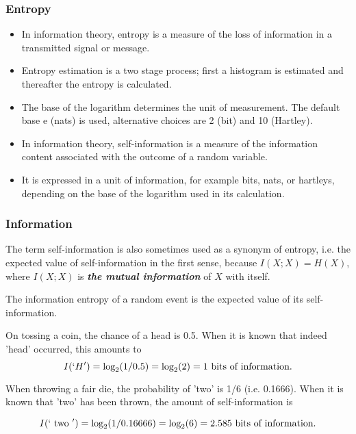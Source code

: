 \begin{frame}


\frametitle{Entropy}


\begin{itemize} \item In information theory, entropy is a measure of the loss of information in a transmitted signal or message.


\item Entropy estimation is a two stage process; first a histogram is estimated and thereafter the entropy is calculated. 


\item 
The base of the logarithm determines the unit of measurement. The default base e (nats) is used, alternative choices are 2 (bit) and 10 (Hartley).


\item In information theory, self-information is a measure of the information content associated with the outcome of a random variable. 
\item It is expressed in a unit of information, for example bits, nats, or hartleys, depending on the base of the logarithm used in its calculation. 


\end{itemize}
\end{frame}


\begin{frame}
\frametitle{Information }


The term self-information is also sometimes used as a synonym of entropy, i.e. the expected value of self-information in the first sense, because 
$I(X;X) = H(X)$, where $I(X;X)$ is \textbf{\emph{the mutual information}} of $X$ with itself.


The information entropy of a random event is the expected value of its self-information.




On tossing a coin, the chance of a head is 0.5. 
When it is known that indeed 'head' occurred, this amounts to
\[I(`H') = \mbox{log}_2 (1/0.5) = \mbox{log}_2(2)  = 1 \mbox{ bits of information}. \]




When throwing a fair die, the probability of 'two' is 1/6 (i.e. 0.1666). When it is known that 'two' has been thrown, the amount of self-information is




\[I(`\mbox{ two }') = \mbox{log}_2 (1/0.16666) = \mbox{log}_2(6)  = 2.585 \mbox{ bits of information}. \]


\end{frame}



